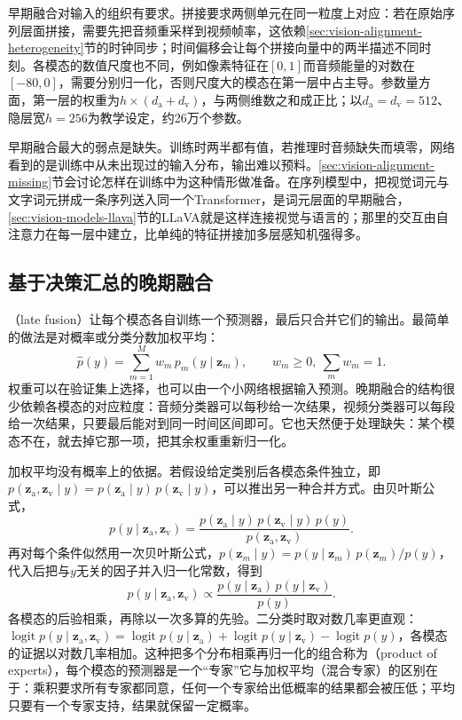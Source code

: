 早期融合对输入的组织有要求。拼接要求两侧单元在同一粒度上对应：若在原始序列层面拼接，需要先把音频重采样到视频帧率，这依赖\ref{sec:vision-alignment-heterogeneity}节的时钟同步；时间偏移会让每个拼接向量中的两半描述不同时刻。各模态的数值尺度也不同，例如像素特征在$[0,1]$而音频能量的对数在$[-80,0]$，需要分别归一化，否则尺度大的模态在第一层中占主导。参数量方面，第一层的权重为$h\times(d_{\mathrm a}+d_{\mathrm v})$，与两侧维数之和成正比；以$d_{\mathrm a}=d_{\mathrm v}=512$、隐层宽$h=256$为教学设定，约26万个参数。

早期融合最大的弱点是缺失。训练时两半都有值，若推理时音频缺失而填零，网络看到的是训练中从未出现过的输入分布，输出难以预料。\ref{sec:vision-alignment-missing}节会讨论怎样在训练中为这种情形做准备。在序列模型中，把视觉词元与文字词元拼成一条序列送入同一个Transformer，是词元层面的早期融合，\ref{sec:vision-models-llava}节的LLaVA就是这样连接视觉与语言的；那里的交互由自注意力在每一层中建立，比单纯的特征拼接加多层感知机强得多。

\subsection{基于决策汇总的晚期融合}
\label{sec:vision-alignment-late-fusion}

（late fusion）让每个模态各自训练一个预测器，最后只合并它们的输出。最简单的做法是对概率或分类分数加权平均：
\begin{equation}
  \hat p(y)=\sum_{m=1}^{M}w_m\,p_m(y\mid\bm z_m),\qquad
  w_m\geq0,\ \sum_m w_m=1.
  \label{eq:vision-alignment-late-average}
\end{equation}
权重可以在验证集上选择，也可以由一个小网络根据输入预测。晚期融合的结构很少依赖各模态的对应粒度：音频分类器可以每秒给一次结果，视频分类器可以每段给一次结果，只要最后能对到同一时间区间即可。它也天然便于处理缺失：某个模态不在，就去掉它那一项，把其余权重重新归一化。

加权平均没有概率上的依据。若假设给定类别后各模态条件独立，即$p(\bm z_{\mathrm a},\bm z_{\mathrm v}\mid y)=p(\bm z_{\mathrm a}\mid y)\,p(\bm z_{\mathrm v}\mid y)$，可以推出另一种合并方式。由贝叶斯公式，
\[
  p(y\mid\bm z_{\mathrm a},\bm z_{\mathrm v})
  =\frac{p(\bm z_{\mathrm a}\mid y)\,p(\bm z_{\mathrm v}\mid y)\,p(y)}{p(\bm z_{\mathrm a},\bm z_{\mathrm v})}.
\]
再对每个条件似然用一次贝叶斯公式，$p(\bm z_m\mid y)=p(y\mid\bm z_m)\,p(\bm z_m)/p(y)$，代入后把与$y$无关的因子并入归一化常数，得到
\begin{equation}
  p(y\mid\bm z_{\mathrm a},\bm z_{\mathrm v})\propto
  \frac{p(y\mid\bm z_{\mathrm a})\,p(y\mid\bm z_{\mathrm v})}{p(y)}.
  \label{eq:vision-alignment-poe}
\end{equation}
各模态的后验相乘，再除以一次多算的先验。二分类时取对数几率更直观：$\operatorname{logit}p(y\mid\bm z_{\mathrm a},\bm z_{\mathrm v})=\operatorname{logit}p(y\mid\bm z_{\mathrm a})+\operatorname{logit}p(y\mid\bm z_{\mathrm v})-\operatorname{logit}p(y)$，各模态的证据以对数几率相加。这种把多个分布相乘再归一化的组合称为（product of experts），每个模态的预测器是一个“专家”它与加权平均（混合专家）的区别在于：乘积要求所有专家都同意，任何一个专家给出低概率的结果都会被压低；平均只要有一个专家支持，结果就保留一定概率。

